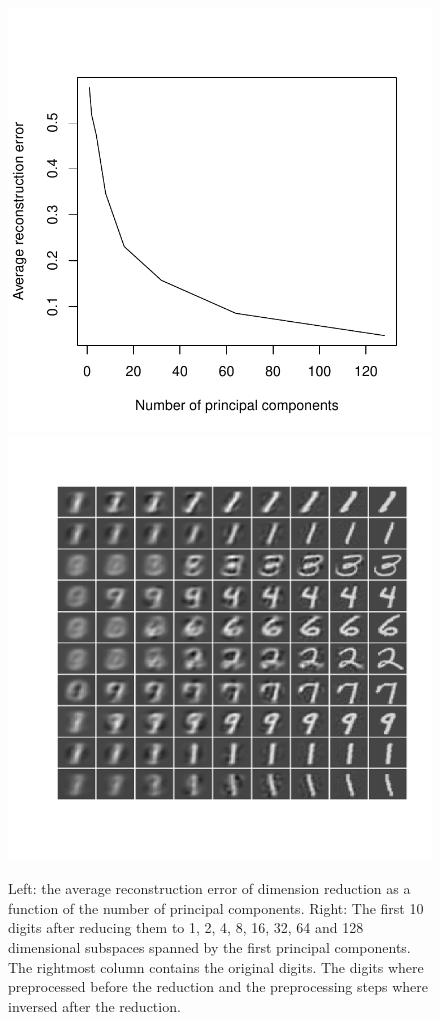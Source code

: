 \documentclass{article}
\begin{document}
\begin{figure}\centering
	\includegraphics[scale=0.5]{error}
	\includegraphics[scale=\sscale]{digitreduce}
	\caption{Left: the average reconstruction error of dimension reduction as a function of the number of principal components.
	Right: The first 10 digits after reducing them to 1, 2, 4, 8, 16, 32, 64 and 128 dimensional subspaces spanned by the first principal components.
The rightmost column contains the original digits.
The digits where preprocessed before the reduction and the preprocessing steps where inversed after the reduction.}\label{fig:reduce}
\end{figure}
\end{document}
